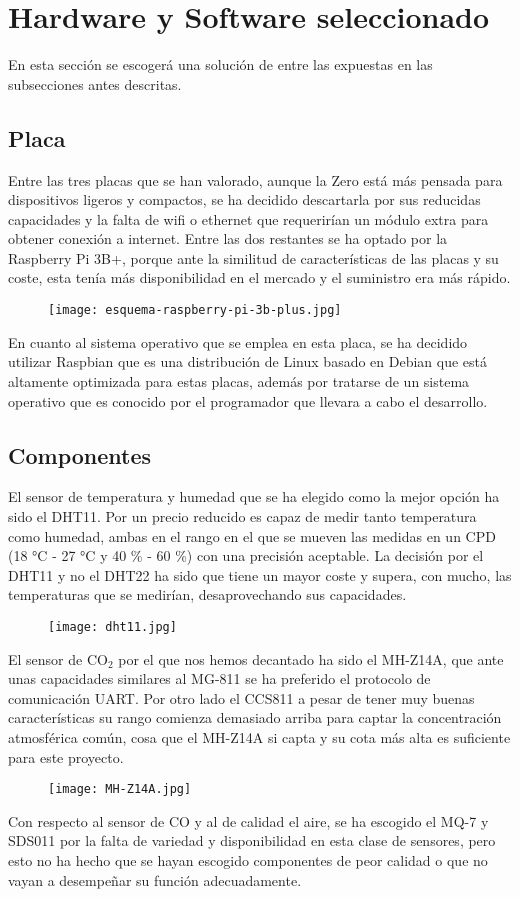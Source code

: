 \section{Hardware y Software seleccionado}
En esta sección se escogerá una solución de entre las expuestas en las subsecciones antes descritas.

\subsection{Placa}
Entre las tres placas que se han valorado, aunque la Zero está más pensada para dispositivos ligeros y compactos, se ha decidido descartarla por sus reducidas capacidades y la falta de wifi o ethernet que requerirían un módulo extra para obtener conexión a internet. Entre las dos restantes se ha optado por la Raspberry Pi 3B+, porque ante la similitud de características de las placas y su coste, esta tenía más disponibilidad en el mercado y el suministro era más rápido. 
\begin{figure}[H]
	{\texttt{[image: esquema-raspberry-pi-3b-plus.jpg]}}
\end{figure}
En cuanto al sistema operativo que se emplea en esta placa, se ha decidido utilizar Raspbian que es una distribución de Linux basado en Debian que está altamente optimizada para estas placas, además por tratarse de un sistema operativo que es conocido por el programador que llevara a cabo el desarrollo.

\subsection{Componentes}
El sensor de temperatura y humedad que se ha elegido como la mejor opción ha sido el DHT11. Por un precio reducido es capaz de medir tanto temperatura como humedad, ambas en el rango en el que se mueven las medidas en un CPD (18 °C - 27 °C y  40 \% - 60 \%) con una precisión aceptable. La decisión por el DHT11 y no el DHT22 ha sido que tiene un mayor coste y supera, con mucho, las temperaturas que se medirían, desaprovechando sus capacidades.
\begin{figure}[H]
	{\texttt{[image: dht11.jpg]}}
\end{figure}
El sensor de CO$_2$ por el que nos hemos decantado ha sido el MH-Z14A, que ante unas capacidades similares al MG-811 se ha preferido el protocolo de comunicación UART. Por otro lado el CCS811 a pesar de tener muy buenas características su rango comienza demasiado arriba para captar la concentración atmosférica común, cosa que el MH-Z14A si capta y su cota más alta es suficiente para este proyecto.
\begin{figure}[H]
	{\texttt{[image: MH-Z14A.jpg]}}
\end{figure}
Con respecto al sensor de CO y al de calidad el aire, se ha escogido el MQ-7 y SDS011 por la falta de variedad y disponibilidad en esta clase de sensores, pero esto no ha hecho que se hayan escogido componentes de peor calidad o que no vayan a desempeñar su función adecuadamente.

